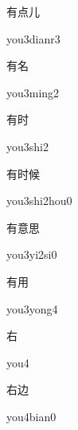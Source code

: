 \begin{multicols*}{2}
\begin{verbete}{有点儿}
\begin{pronuncia}{you3dianr3}
\end{pronuncia}
\end{verbete}

\begin{verbete}{有名}
\begin{pronuncia}{you3ming2}
\end{pronuncia}
\end{verbete}

\begin{verbete}{有时}
\begin{pronuncia}{you3shi2}
\end{pronuncia}
\end{verbete}

\begin{verbete}{有时候}
\begin{pronuncia}{you3shi2hou0}
\end{pronuncia}
\end{verbete}

\begin{verbete}[you3yi2si0]{有意思}
\begin{pronuncia}{you3yi2si0}
\end{pronuncia}
\end{verbete}

\begin{verbete}{有用}
\begin{pronuncia}{you3yong4}
\end{pronuncia}
\end{verbete}

\begin{verbete}[you4]{右}
\begin{pronuncia}{you4}
\end{pronuncia}
\end{verbete}

\begin{verbete}{右边}
\begin{pronuncia}{you4bian0}
\end{pronuncia}
\end{verbete}


\end{multicols*}
